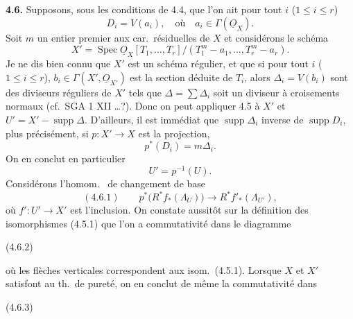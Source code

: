 \documentclass[11pt,a4paper]{article}
\begin{document}
\textbf{4.6.} Supposons,   sous les conditions de 4.4, que l'on ait pour tout $i$ ($1 \leq i \leq r$)
\[
D_i = V(a_i) , \quad \text{où} \quad a_i \in \Gamma(\underline{O}_X) .
\]
Soit $m$ un entier premier aux car.\ résiduelles de $X$  et considérons le schéma
\[
X' = \operatorname{Spec} \underline{O}_X[T_1, \ldots, T_r]/(T_1^m - a_1, \ldots, T_r^m - a_r) .
\]
Je ne dis bien connu que $X'$ est un schéma régulier, et que \struck{\ill{}} si pour tout $i$ ($1 \leq i \leq r$), \struck{\ill{}} $b_i \in \Gamma(X', \underline{O}_{X'})$ est la section déduite de $T_i$, alors  $\Delta_i = V(b_i)$ sont des diviseurs réguliers de $X'$ tels que $\Delta = \sum \Delta_i$ soit un diviseur à croisements normaux (cf.\ SGA 1 XII …?). Donc on peut appliquer 4.5 à $X'$ et $U' = X' - \operatorname{supp} \Delta$. D'ailleurs, il est immédiat que $\operatorname{supp} \Delta_i$   inverse de $\operatorname{supp} D_i$, plus précisément, si $p : X' \to X$ est la projection,
\[
p^*(D_i) = m \Delta_i .
\]
On en conclut en particulier
\[
U' = p^{-1}(U) .
\]
Considérons l'homom.\ \struck{\ill{}} de changement de base
\[
(4.6.1) \qquad p^*\bigl(R^* f_*(\Lambda_U)\bigr) \longrightarrow R^* f'_*(\Lambda_{U'}) ,
\]
où $f' : U' \to X'$ est l'inclusion. \struck{\ill{}} On constate  aussitôt sur la définition des isomorphismes (4.5.1) que l'on a commutativité dans le diagramme


(4.6.2)


où les flèches verticales \struck{\ill{}} correspondent aux isom.\ (4.5.1). Lorsque $X$ et $X'$ satisfont au th.\ de pureté, on en conclut de même la commutativité dans

(4.6.3)

\end{document}
